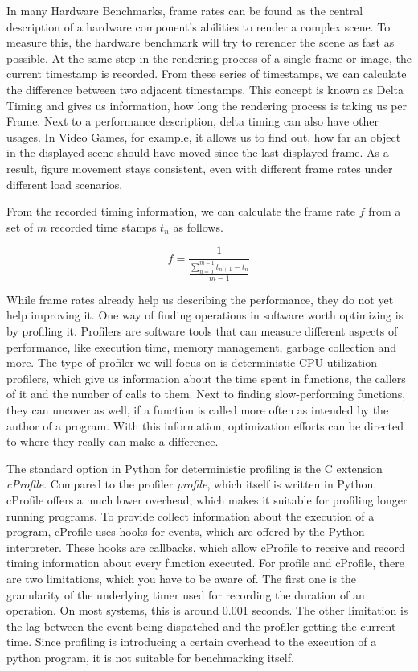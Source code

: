 In many Hardware Benchmarks, frame rates can be found as the central description
of a hardware component's abilities to render a complex scene. To measure this,
the hardware benchmark will try to rerender the scene as fast as possible. At
the same step in the rendering process of a single frame or image, the current
timestamp is recorded. From these series of timestamps, we can calculate the
difference between two adjacent timestamps. This concept is known as Delta
Timing and gives us information, how long the rendering process is taking us per
Frame. Next to a performance description, delta timing can also have other
usages. In Video Games, for example, it allows us to find out, how far an object
in the displayed scene should have moved since the last displayed frame. As a
result, figure movement stays consistent, even with different frame rates under
different load scenarios.
\cite{DeltaTiming}

From the recorded timing information, we can calculate the frame rate $f$ from a
set of $m$ recorded time stamps $t_n$ as follows.
\cite{FrameRates}

$$f = \frac{1}{\frac{ \sum_{n=0}^{m-1} t_{n+1} - t_{n} }{ m - 1 }}$$

While frame rates already help us describing the performance, they do not yet help
improving it. One way of finding operations in software worth optimizing is by
profiling it.  Profilers are software tools that can measure different
aspects of performance, like execution time, memory management, garbage
collection and more. The type of profiler we will focus on is deterministic CPU
utilization profilers, which give us information about the time spent in
functions, the callers of it and the number of calls to them. Next to finding
slow-performing functions, they can uncover as well, if a function is called
more often as intended by the author of a program. With this information, optimization
efforts can be directed to where they really can make a difference.
\cite{CProfilerExample}

The standard option in Python for deterministic profiling is the C extension
\emph{cProfile}. Compared to the profiler \emph{profile}, which itself is
written in Python, cProfile offers a much lower overhead, which makes it
suitable for profiling longer running programs.  To provide collect information
about the execution of a program, cProfile uses hooks for events, which are
offered by the Python interpreter. These hooks are callbacks, which allow
cProfile to receive and record timing information about every function executed.
For profile and cProfile, there are two limitations, which you have to be aware
of. The first one is the granularity of the underlying
timer used for recording the duration of an operation. On most systems, this is
around 0.001 seconds.  The other limitation is the lag between the event being
dispatched and the profiler getting the current time. Since profiling is
introducing a certain overhead to the execution of a python program, it is not
suitable for benchmarking itself.
\cite{CProfiler}
